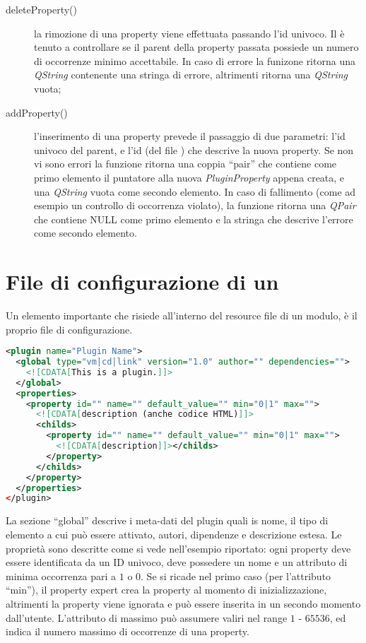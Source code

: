 \begin{description}
\item[deleteProperty()] la rimozione di una property viene effettuata passando l'id univoco. Il \plugin{} è tenuto a controllare se il parent della property passata possiede un numero di occorrenze minimo accettabile. In caso di errore la funizone ritorna una \emph{QString} contenente una stringa di errore, altrimenti ritorna una \emph{QString} vuota;

\item[addProperty()] l'inserimento di una property prevede il passaggio di due parametri: l'id univoco del parent, e l'id (del file \xml{}) che descrive la nuova property. Se non vi sono errori la funzione ritorna una coppia ``pair'' che contiene come primo elemento il puntatore alla nuova \emph{PluginProperty} appena creata, e una \emph{QString} vuota come secondo elemento. In caso di fallimento (come ad esempio un controllo di occorrenza violato), la funzione ritorna una \emph{QPair} che contiene NULL come primo elemento e la stringa che descrive l'errore come secondo elemento.
\end{description}

\section*{File di configurazione di un \plugin{}}
Un elemento importante che risiede all'interno del resource file di un modulo, è il proprio file di configurazione.
\begin{lstlisting}[language=xml]
<plugin name="Plugin Name">
  <global type="vm|cd|link" version="1.0" author="" dependencies="">
    <![CDATA[This is a plugin.]]>
  </global>
  <properties>
    <property id="" name="" default_value="" min="0|1" max="">
      <![CDATA[description (anche codice HTML)]]>
      <childs>
        <property id="" name="" default_value="" min="0|1" max="">
          <![CDATA[description]]></childs>
        </property>
      </childs>
    </property> 
  </properties>
</plugin>
\end{lstlisting}

La sezione ``global'' descrive i meta-dati del plugin quali is nome, il tipo di elemento a cui può essere attivato, autori, dipendenze e descrizione estesa. Le proprietà sono descritte come si vede nell'esempio riportato: ogni property deve essere identificata da un ID univoco, deve possedere un nome e un attributo di minima occorrenza pari a $1$ o $0$. Se si ricade nel primo caso (per l'attributo ``min''), il property expert crea la property al momento di inizializzazione, altrimenti la property viene ignorata e può essere inserita in un secondo momento dall'utente. L'attributo di massimo può assumere valiri nel range $1$ - $65536$, ed indica il numero massimo di occorrenze di una property.

